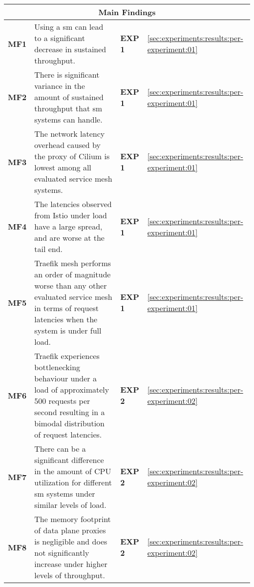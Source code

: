\begin{table}[!htbp]
\begin{tabularx}{\linewidth}{@{}lXll@{}}
\toprule
\multicolumn{4}{c}{\textbf{Main Findings}} \\
\midrule

\textbf{MF1} &
Using a \gls{sm} can lead to a significant decrease in sustained throughput. &
\textbf{EXP 1} &
\cref{sec:experiments:results:per-experiment:01} \\
\midrule
  
\textbf{MF2} &
There is significant variance in the amount of sustained throughput that \gls{sm} systems can handle. &
\textbf{EXP 1} &
\cref{sec:experiments:results:per-experiment:01} \\
\midrule 
  
\textbf{MF3} &
The network latency overhead caused by the proxy of Cilium is lowest among all evaluated service mesh systems. &
\textbf{EXP 1} &
\cref{sec:experiments:results:per-experiment:01} \\
\midrule  
  
\textbf{MF4} &
The latencies observed from Istio under load have a large spread, and are worse at the tail end. &
\textbf{EXP 1} &
\cref{sec:experiments:results:per-experiment:01} \\
\midrule    
  
\textbf{MF5} &
Traefik mesh performs an order of magnitude worse than any other evaluated service mesh in terms of request latencies when the system is under full load. &
\textbf{EXP 1} &
\cref{sec:experiments:results:per-experiment:01} \\
\midrule  
  
\textbf{MF6} &
Traefik experiences bottlenecking behaviour under a load of approximately 500 requests per second resulting in a bimodal distribution of request latencies. &
\textbf{EXP 2} &
\cref{sec:experiments:results:per-experiment:02} \\
\midrule  
  
\textbf{MF7} &
There can be a significant difference in the amount of CPU utilization for different \gls{sm} systems under similar levels of load. &
\textbf{EXP 2} &
\cref{sec:experiments:results:per-experiment:02} \\
\midrule  
  
\textbf{MF8} &
The memory footprint of data plane proxies is negligible and does not significantly increase under higher levels of throughput. &
\textbf{EXP 2} &
\cref{sec:experiments:results:per-experiment:02} \\
\midrule  
  

\end{tabularx}
\end{table}
